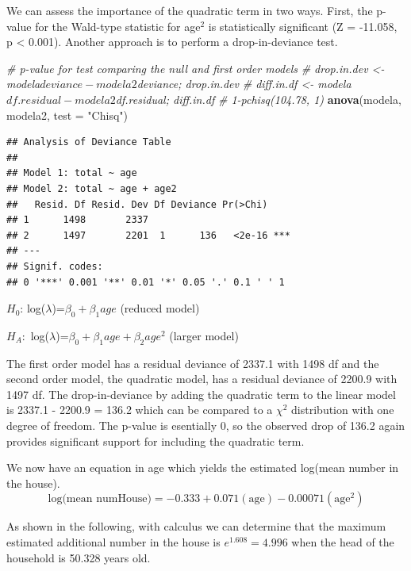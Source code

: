 \documentclass[
]{krantz}
\newenvironment{Shaded}{\begin{snugshade}}{\end{snugshade}}
\newcommand{\CommentTok}[1]{\textcolor[rgb]{0.37,0.37,0.37}{\textit{#1}}}
\newcommand{\DataTypeTok}[1]{\textcolor[rgb]{0.27,0.27,0.27}{#1}}
\newcommand{\KeywordTok}[1]{\textcolor[rgb]{0.27,0.27,0.27}{\textbf{#1}}}
\newcommand{\NormalTok}[1]{#1}
\newcommand{\StringTok}[1]{\textcolor[rgb]{0.5,0.5,0.5}{#1}}
\begin{document}
We can assess the importance of the quadratic term in two ways. First, the p-value for the Wald-type statistic for age\(^2\) is statistically significant (Z = -11.058, p \textless{} 0.001). Another approach is to perform a drop-in-deviance test.

\begin{Shaded}
\begin{Highlighting}[]
\CommentTok{# p-value for test comparing the null and first order models}
\CommentTok{# drop.in.dev <- modela$deviance - modela2$deviance; drop.in.dev}
\CommentTok{# diff.in.df <- modela$df.residual - modela2$df.residual; diff.in.df}
\CommentTok{# 1-pchisq(104.78, 1)}
\KeywordTok{anova}\NormalTok{(modela, modela2, }\DataTypeTok{test =} \StringTok{"Chisq"}\NormalTok{)}
\end{Highlighting}
\end{Shaded}

\begin{verbatim}
## Analysis of Deviance Table
## 
## Model 1: total ~ age
## Model 2: total ~ age + age2
##   Resid. Df Resid. Dev Df Deviance Pr(>Chi)    
## 1      1498       2337                         
## 2      1497       2201  1      136   <2e-16 ***
## ---
## Signif. codes:  
## 0 '***' 0.001 '**' 0.01 '*' 0.05 '.' 0.1 ' ' 1
\end{verbatim}

\(H_0\): log(\(\lambda\))=\(\beta_0+\beta_1age\) (reduced model)

\(H_A:\) log(\(\lambda\))=\(\beta_0+\beta_1age + \beta_2age^2\) (larger model)

The first order model has a residual deviance of 2337.1 with 1498 df and the second order model, the quadratic model, has a residual deviance of 2200.9 with 1497 df. The drop-in-deviance by adding the quadratic term to the linear model is 2337.1 - 2200.9 = 136.2 which can be compared to a \(\chi^2\) distribution with one degree of freedom. The p-value is esentially 0, so the observed drop of 136.2 again provides significant support for including the quadratic term.

We now have an equation in age which yields the estimated log(mean number in the house).\\
\[
\textrm{log(mean numHouse)} =  -0.333 + 0.071(\textrm{age}) - 0.00071 (\textrm{age}^2)
\]

As shown in the following, with calculus we can determine that the maximum estimated additional number in the house is \(e^{1.608} = 4.996\) when the head of the household is 50.328 years old.
\end{document}
